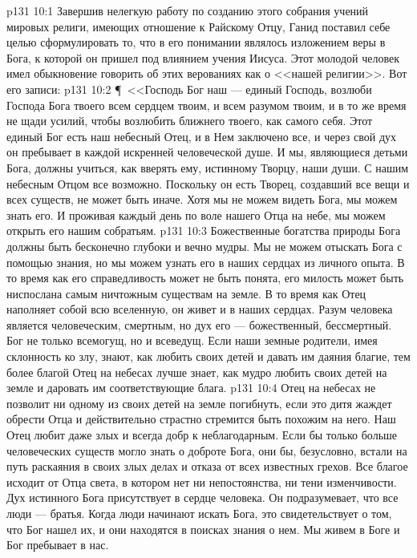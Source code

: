 \vs p131 10:1 Завершив нелегкую работу по созданию этого собрания учений мировых религи, имеющих отношение к Райскому Отцу, Ганид поставил себе целью сформулировать то, что в его понимании являлось изложением веры в Бога, к которой он пришел под влиянием учения Иисуса. Этот молодой человек имел обыкновение говорить об этих верованиях как о <<нашей религии>>. Вот его записи:
\vs p131 10:2 \P\ <<Господь Бог наш --- единый Господь, возлюби Господа Бога твоего всем сердцем твоим, и всем разумом твоим, и в то же время не щади усилий, чтобы возлюбить ближнего твоего, как самого себя. Этот единый Бог есть наш небесный Отец, и в Нем заключено все, и через свой дух он пребывает в каждой искренней человеческой душе. И мы, являющиеся детьми Бога, должны учиться, как вверять ему, истинному Творцу, наши души. С нашим небесным Отцом все возможно. Поскольку он есть Творец, создавший все вещи и всех существ, не может быть иначе. Хотя мы не можем видеть Бога, мы можем знать его. И проживая каждый день по воле нашего Отца на небе, мы можем открыть его нашим собратьям.
\vs p131 10:3 Божественные богатства природы Бога должны быть бесконечно глубоки и вечно мудры. Мы не можем отыскать Бога с помощью знания, но мы можем узнать его в наших сердцах из личного опыта. В то время как его справедливость может не быть понята, его милость может быть ниспослана самым ничтожным существам на земле. В то время как Отец наполняет собой всю вселенную, он живет и в наших сердцах. Разум человека является человеческим, смертным, но дух его --- божественный, бессмертный. Бог не только всемогущ, но и всеведущ. Если наши земные родители, имея склонность ко злу, знают, как любить своих детей и давать им даяния благие, тем более благой Отец на небесах лучше знает, как мудро любить своих детей на земле и даровать им соответствующие блага.
\vs p131 10:4 Отец на небесах не позволит ни одному из своих детей на земле погибнуть, если это дитя жаждет обрести Отца и действительно страстно стремится быть похожим на него. Наш Отец любит даже злых и всегда добр к неблагодарным. Если бы только больше человеческих существ могло знать о доброте Бога, они бы, безусловно, встали на путь раскаяния в своих злых делах и отказа от всех известных грехов. Все благое исходит от Отца света, в котором нет ни непостоянства, ни тени изменчивости. Дух истинного Бога присутствует в сердце человека. Он подразумевает, что все люди --- братья. Когда люди начинают искать Бога, это свидетельствует о том, что Бог нашел их, и они находятся в поисках знания о нем. Мы живем в Боге и Бог пребывает в нас.
